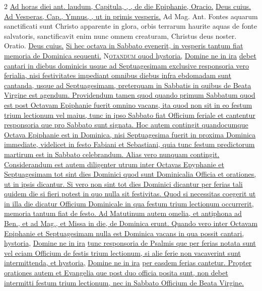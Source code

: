 \begin{multicols*}{2}
\newline \ul{Ad horas diei ant. laudum, Capitula, \Rbar , \Vbar , de die Epiphanie, Oracio.} \hyperlink{deus-cuius-unigenitus-epiphanie}{Deus cuius.} \ul{Ad Vesperas, Cap., Ymnus, \Vbar , ut in primis vesperis.} {\color{Red} Ad Mag. Ant.} Fontes aquarum sanctificati sunt Christo apparente in glora, orbis terrarum haurite aquas de fonte salvatoris, sanctificavit enim nunc omnem creaturam, Christus deus noster. {\color{Red} Oratio.} \hyperlink{deus-cuius-unigenitus-epiphanie}{Deus cuius.} \ul{Si hec octava in Sabbato evenerit, in vesperis tantum fiat memoria de Dominica sequenti.}
\lettrine[lines=2]{\zallmancaps \color{Red} N}{}\ul{\textsc{otandum} quod hystoria,} \hyperlink{domine-ne-in-ira}{Domine ne in ira} \ul{debet cantari in diebus dominicis usque ad Septuagesimam exclusive responsoria vero ferialia, nisi festivitates impediant omnibus diebus infra ebdomadam sunt cantanda, usque ad Septuagesimam, preterquam in Sabbatis in quibus de Beata Virgine est agendum.
Providendum tamen quod quando primum Sabbatum quod est post Octavam Epiphanie fuerit omnino vacans, ita quod non sit in eo festum trium lectionum vel maius, tunc in ipso Sabbato fiat Officium feriale et cantentur responsoria que pro Sabbato sunt signata.
Hoc autem contingit quandocumque Octava Epiphanie est in Dominica, nisi Septuagesima fuerit in proxima Dominica immediate, videlicet in festo Fabiani et Sebastiani, quia tunc festum predictorum martirum est in Sabbato celebrandum. Alias vero nunquam contingit.}
\newline \ul{Considerandum est autem diligenter utrum inter Octavas Epyphanie et Septuagesimam tot sint dies Dominici quod sunt Dominicalia Officia et orationes, ut in ipsis dicantur. Si vero non sint tot dies Dominici dicantur per ferias tali quidem die si fieri potest in quo nulla sit festivitas. Quod si necessitas coegerit ut in illa die dicatur Officium Dominicale in qua festum trium lectionum occurrerit, memoria tantum fiat de festo.
Ad Matutinum autem omelia, et antiphona ad Ben., et ad Mag., et Missa in die, de Dominica erunt.
Quando vero inter Octavam Epiphanie et Septuagesimam nulla est Dominica vacans in qua possit cantari, hystoria,} \hyperlink{domine-ne-in-ira}{Domine ne in ira} \ul{tunc responsoria de Psalmis que per ferias notata sunt vel eciam Officium de festis trium lectionum, si alie ferie non vacaverint sunt intermittenda, et hystoria,} \hyperlink{domine-ne-in-ira}{Domine ne in ira} \ul{per easdem ferias cantetur.
Propter orationes autem et Evangelia que post duo officia posita sunt, non debet intermitti festum trium lectionum, nec in Sabbato Officium de Beata Virgine.}

\end{multicols*}
